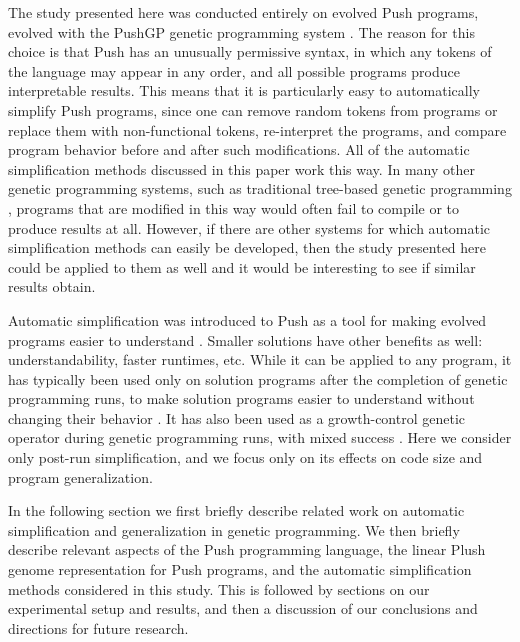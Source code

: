 The study presented here was conducted entirely on evolved Push programs, evolved with the PushGP genetic programming system \cite{spector:2002:GPEM}. The reason for this choice is that Push has an unusually permissive syntax, in which any tokens of the language may appear in any order, and all possible programs produce interpretable results. This means that it is particularly easy to automatically simplify Push programs, since one can remove random tokens from programs or replace them with non-functional tokens, re-interpret the programs, and compare program behavior before and after such modifications. All of the automatic simplification methods discussed in this paper work this way. In many other genetic programming systems, such as traditional tree-based genetic programming \cite{koza:book}, programs that are modified in this way would often fail to compile or to produce results at all. However, if there are other systems for which automatic simplification methods can easily be developed, then the study presented here could be applied to them as well and it would be interesting to see if similar results obtain.

Automatic simplification was introduced to Push as a tool for making evolved programs easier to understand \cite{Robinson:2001:GPtieus, spector:2002:GPEM}. Smaller solutions have other benefits as well: understandability, faster runtimes, etc. While it can be applied to any program, it has typically been used only on solution programs after the completion of genetic programming runs, to make solution programs easier to understand without changing their behavior \cite{Spector:2014:GECCOcomp}. It has also been used as a growth-control genetic operator during genetic programming runs, with mixed success \cite{Zhan:2014:GECCOcomp}. Here we consider only post-run simplification, and we focus only on its effects on code size and program generalization.

In the following section we first briefly describe related work on automatic simplification and generalization in genetic programming. We then briefly describe relevant aspects of the Push programming language, the linear Plush genome representation for Push programs, and the automatic simplification methods considered in this study. This is followed by sections on our experimental setup and results, and then a discussion of our conclusions and directions for future research.


